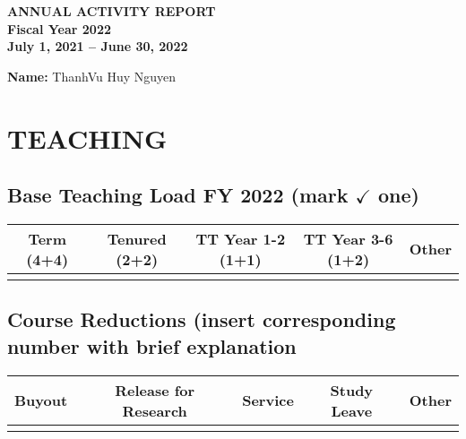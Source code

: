 \documentclass[11pt]{article}
\newcommand{\fy}{2022}
\newcommand{\fyperiod}{July 1, 2021 -- June 30, 2022}
\newcommand{\myname}{ThanhVu Huy Nguyen}
\begin{document}
\newpage
\begin{center}
  \textbf{ANNUAL ACTIVITY REPORT\\
    Fiscal Year \fy{}\\
    \fyperiod}
\end{center}

\textbf{Name:} \myname{}

\section{TEACHING}

\subsection{Base Teaching Load FY \fy{} (mark $\checkmark$ one)}
\begin{tabular}{ccccc}
    \toprule
    \textbf{Term (4+4)}& \textbf{Tenured (2+2)}& \textbf{TT Year 1-2 (1+1)}& \textbf{TT Year 3-6 (1+2)}&\textbf{Other}\\
      \midrule
      & & & & \\
      \bottomrule
  \end{tabular}

\subsection{Course Reductions (insert corresponding number with brief explanation}
\begin{center}
  \begin{tabular}{ccccc}
    \toprule
    \textbf{Buyout}&\textbf{Release for Research}&\textbf{Service}&\textbf{Study Leave}&\textbf{Other}\\
    \midrule
    & & & & \\
    \bottomrule
  \end{tabular}
\end{center}
\end{document}
